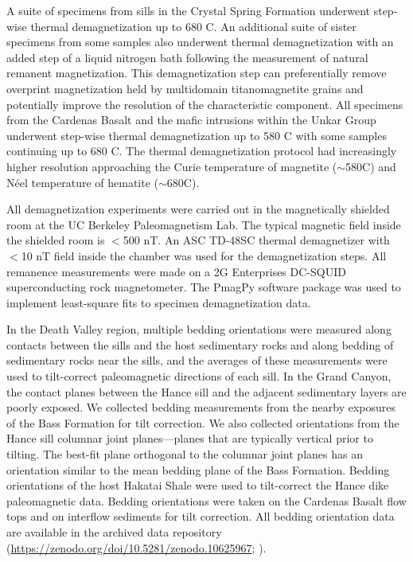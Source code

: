 A suite of specimens from sills in the Crystal Spring Formation underwent step-wise thermal demagnetization up to 680 \textdegree C. An additional suite of sister specimens from some samples also underwent thermal demagnetization with an added step of a liquid nitrogen bath following the measurement of natural remanent magnetization. This demagnetization step can preferentially remove overprint magnetization held by multidomain titanomagnetite grains and potentially improve the resolution of the characteristic component. All specimens from the Cardenas Basalt and the mafic intrusions within the Unkar Group underwent step-wise thermal demagnetization up to 580 \textdegree C with some samples continuing up to 680 \textdegree C. The thermal demagnetization protocol had increasingly higher resolution approaching the Curie temperature of magnetite ($\sim$580\textdegree C) and N\'eel temperature of hematite ($\sim$680\textdegree C).

All demagnetization experiments were carried out in the magnetically shielded room at the UC Berkeley Paleomagnetism Lab. The typical magnetic field inside the shielded room is $<$500 nT. An ASC TD-48SC thermal demagnetizer with $<$10 nT field inside the chamber was used for the demagnetization steps. All remanence measurements were made on a 2G Enterprises DC-SQUID superconducting rock magnetometer. The PmagPy software package \citep{Tauxe2016a} was used to implement least-square fits \citep{Kirschvink1980a} to specimen demagnetization data. 

In the Death Valley region, multiple bedding orientations were measured along contacts between the sills and the host sedimentary rocks and along bedding of sedimentary rocks near the sills, and the averages of these measurements were used to tilt-correct paleomagnetic directions of each sill. In the Grand Canyon, the contact planes between the Hance sill and the adjacent sedimentary layers are poorly exposed. We collected bedding measurements from the nearby exposures of the Bass Formation for tilt correction. We also collected orientations from the Hance sill columnar joint planes---planes that are typically vertical prior to tilting. The best-fit plane orthogonal to the columnar joint planes has an orientation similar to the mean bedding plane of the Bass Formation. Bedding orientations of the host Hakatai Shale were used to tilt-correct the Hance dike paleomagnetic data. Bedding orientations were taken on the Cardenas Basalt flow tops and on interflow sediments for tilt correction. All bedding orientation data are available in the archived data repository (\url{https://zenodo.org/doi/10.5281/zenodo.10625967}; \cite{Zhang2024a}).

